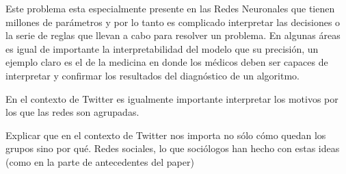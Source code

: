 Este problema esta especialmente presente en las Redes Neuronales que tienen millones de parámetros y por lo tanto es complicado interpretar las decisiones o la serie de reglas que llevan a cabo para resolver un problema. En algunas áreas es igual de importante la interpretabilidad del modelo que su precisión, un ejemplo claro es el de la medicina en donde los médicos deben ser capaces de interpretar y confirmar los resultados del diagnóstico de un algoritmo.

En el contexto de Twitter es igualmente importante interpretar los motivos por los que las redes son agrupadas.

Explicar que en el contexto de Twitter nos importa no sólo cómo quedan los grupos sino por qué. 
Redes sociales, lo que sociólogos han hecho con estas ideas
(como en la parte de antecedentes del paper)